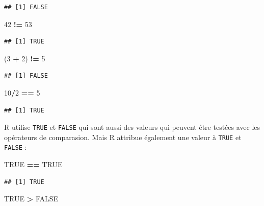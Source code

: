 \documentclass[]{book}
\newenvironment{Shaded}{\begin{snugshade}}{\end{snugshade}}
\newcommand{\DecValTok}[1]{\textcolor[rgb]{0.00,0.00,0.81}{#1}}
\newcommand{\NormalTok}[1]{#1}
\newcommand{\OperatorTok}[1]{\textcolor[rgb]{0.81,0.36,0.00}{\textbf{#1}}}
\newcommand{\OtherTok}[1]{\textcolor[rgb]{0.56,0.35,0.01}{#1}}
\newcommand{\StringTok}[1]{\textcolor[rgb]{0.31,0.60,0.02}{#1}}
\begin{document}
\begin{verbatim}
## [1] FALSE
\end{verbatim}

\begin{Shaded}
\begin{Highlighting}[]
\DecValTok{42} \OperatorTok{!=}\StringTok{ }\DecValTok{53}
\end{Highlighting}
\end{Shaded}

\begin{verbatim}
## [1] TRUE
\end{verbatim}

\begin{Shaded}
\begin{Highlighting}[]
\NormalTok{(}\DecValTok{3} \OperatorTok{+}\StringTok{ }\DecValTok{2}\NormalTok{) }\OperatorTok{!=}\StringTok{ }\DecValTok{5}
\end{Highlighting}
\end{Shaded}

\begin{verbatim}
## [1] FALSE
\end{verbatim}

\begin{Shaded}
\begin{Highlighting}[]
\DecValTok{10}\OperatorTok{/}\DecValTok{2} \OperatorTok{==}\StringTok{ }\DecValTok{5}
\end{Highlighting}
\end{Shaded}

\begin{verbatim}
## [1] TRUE
\end{verbatim}

R utilise \texttt{TRUE} et \texttt{FALSE} qui sont aussi des valeurs qui peuvent être testées avec les opérateurs de comparasion. Mais R attribue également une valeur à \texttt{TRUE} et \texttt{FALSE} :

\begin{Shaded}
\begin{Highlighting}[]
\OtherTok{TRUE} \OperatorTok{==}\StringTok{ }\OtherTok{TRUE}
\end{Highlighting}
\end{Shaded}

\begin{verbatim}
## [1] TRUE
\end{verbatim}

\begin{Shaded}
\begin{Highlighting}[]
\OtherTok{TRUE} \OperatorTok{>}\StringTok{ }\OtherTok{FALSE}
\end{Highlighting}
\end{Shaded}
\end{document}
